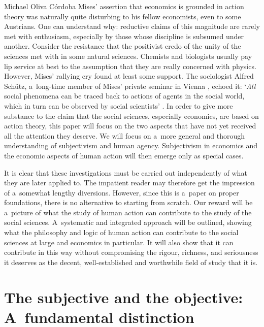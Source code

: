 \begin{artengenv}{Michael Oliva Córdoba}
Mises' assertion that economics is grounded in action theory was naturally quite disturbing to his fellow economists, even to some Austrians. One can understand why: reductive claims of this magnitude are rarely met with enthusiasm, especially by those whose discipline is subsumed under another. Consider the resistance that the positivist credo of the unity of the sciences met with in some natural sciences. Chemists and biologists usually pay lip service at best to the assumption that they are really concerned with physics. However, Mises' rallying cry found at least some support. The sociologist Alfred Schütz, a~long-time member of Mises' private seminar in Vienna 
\parencite[][p.5ff]{prendergast_alfred_1986}, %
 echoed it: ‘\textit{All} social phenomena can be traced back to actions of agents in the social world, which in turn can be observed by social scientists' 
\parencites[][p.96]{schutz_political_1996}[cf.][p.26]{schutz_common-sense_1953}[][p.122]{kurrild-klitgaard_rationality_2001}. %
 In order to give more substance to the claim that the social sciences, especially economics, are based on action theory, this paper will focus on the two aspects that have not yet received all the attention they deserve. We will focus on a~more general and thorough understanding of subjectivism and human agency. Subjectivism in economics and the economic aspects of human action will then emerge only as special cases.



It is clear that these investigations must be carried out independently of what they are later applied to. The impatient reader may therefore get the impression of a~somewhat lengthy diversions. However, since this is a~paper on proper foundations, there is no alternative to starting from scratch. Our reward will be a~picture of what the study of human action can contribute to the study of the social sciences. A~systematic and integrated approach will be outlined, showing what the philosophy and logic of human action can contribute to the social sciences at large and economics in particular. It will also show that it can contribute in this way without compromising the rigour, richness, and seriousness it deserves as the decent, well-established and worthwhile field of study that it is.



\section{The subjective and the objective: A~fundamental distinction}


\end{artengenv}
